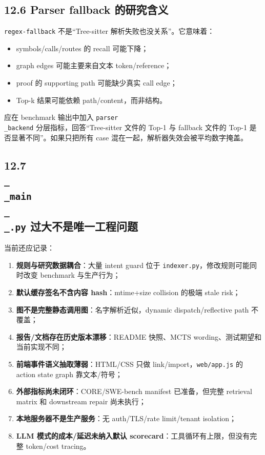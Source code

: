 \documentclass[UTF8,12pt,openany]{ctexbook}
\begin{document}
\subsection{12.6 Parser fallback 的研究含义}

\texttt{regex-fallback} 不是“Tree-sitter 解析失败也没关系”。它意味着：\par

\begin{itemize}
\item symbols/calls/routes 的 recall 可能下降；
\item graph edges 可能主要来自文本 token/reference；
\item proof 的 supporting path 可能缺少真实 call edge；
\item Top-k 结果可能依赖 path/content，而非结构。
\end{itemize}

应在 benchmark 输出中加入 \texttt{parser\\_backend} 分层指标，回答“Tree-sitter 文件的 Top-1 与 fallback 文件的 Top-1 是否显著不同”。如果只把所有 case 混在一起，解析器失效会被平均数字掩盖。\par

\subsection{12.7 \texttt{\\_\\_main\\_\\_.py} 过大不是唯一工程问题}

当前还应记录：\par

\begin{enumerate}
\item \textbf{规则与研究数据耦合}：大量 intent guard 位于 \texttt{indexer.py}，修改规则可能同时改变 benchmark 与生产行为；
\item \textbf{默认缓存签名不含内容 hash}：mtime+size collision 的极端 stale risk；
\item \textbf{图不是完整静态调用图}：名字解析近似，dynamic dispatch/reflective path 不覆盖；
\item \textbf{报告/文档存在历史版本漂移}：README 快照、MCTS wording、测试期望和当前实现不同；
\item \textbf{前端事件语义抽取薄弱}：HTML/CSS 只做 link/import，\texttt{web/app.js} 的 action state graph 靠文本/符号；
\item \textbf{外部指标尚未闭环}：CORE/SWE-bench manifest 已准备，但完整 retrieval matrix 和 downstream repair 尚未执行；
\item \textbf{本地服务器不是生产服务}：无 auth/TLS/rate limit/tenant isolation；
\item \textbf{LLM 模式的成本/延迟未纳入默认 scorecard}：工具循环有上限，但没有完整 token/cost tracing。
\end{enumerate}
\end{document}
